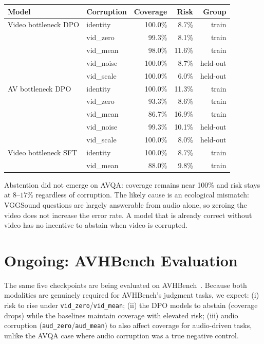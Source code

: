 \documentclass[11pt,a4paper]{article}
\begin{document}
\begin{center}
\small
\begin{tabular}{llrrr}
\toprule
\textbf{Model} & \textbf{Corruption} & \textbf{Coverage} & \textbf{Risk} & \textbf{Group} \\
\midrule
Video bottleneck DPO & identity   & 100.0\% &  8.7\% & train \\
                     & vid\_zero  &  99.3\% &  8.1\% & train \\
                     & vid\_mean  &  98.0\% & 11.6\% & train \\
                     & vid\_noise & 100.0\% &  8.7\% & held-out \\
                     & vid\_scale & 100.0\% &  6.0\% & held-out \\
\midrule
AV bottleneck DPO    & identity   & 100.0\% & 11.3\% & train \\
                     & vid\_zero  &  93.3\% &  8.6\% & train \\
                     & vid\_mean  &  86.7\% & 16.9\% & train \\
                     & vid\_noise &  99.3\% & 10.1\% & held-out \\
                     & vid\_scale & 100.0\% &  8.0\% & held-out \\
\midrule
Video bottleneck SFT & identity   & 100.0\% &  8.7\% & train \\
                     & vid\_mean  &  88.0\% &  9.8\% & train \\
\bottomrule
\end{tabular}
\end{center}

Abstention did not emerge on AVQA: coverage remains near 100\% and risk stays
at $8$--$17$\% regardless of corruption.  The likely cause is an ecological
mismatch: VGGSound questions are largely answerable from audio alone, so
zeroing the video does not increase the error rate.  A model that is already
correct without video has no incentive to abstain when video is corrupted.

\section{Ongoing: AVHBench Evaluation}

The same five checkpoints are being evaluated on AVHBench~\cite{avhbench2024}.
Because both modalities are genuinely required for AVHBench's judgment tasks,
we expect: (i) risk to rise under \texttt{vid\_zero}/\texttt{vid\_mean};
(ii) the DPO models to abstain (coverage drops) while the baselines maintain
coverage with elevated risk; (iii) audio corruption
(\texttt{aud\_zero}/\texttt{aud\_mean}) to also affect coverage for
audio-driven tasks, unlike the AVQA case where audio corruption was a
true negative control.



\end{document}
